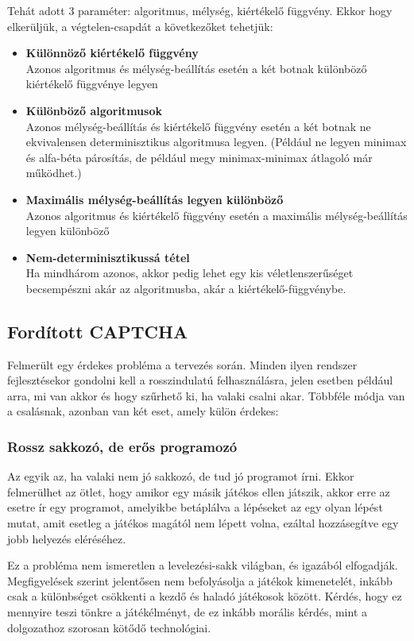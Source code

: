 \documentclass[twoside, a4paper, 12pt]{article}
\begin{document}
Tehát adott 3 paraméter: algoritmus, mélység, kiértékelő függvény. Ekkor hogy elkerüljük, a végtelen-csapdát a következőket tehetjük:
\begin{itemize}
	\item \textbf{Különnöző kiértékelő függvény} \\ 
	Azonos algoritmus és mélység-beállítás esetén a két botnak különböző kiértékelő függvénye legyen
	
	\item \textbf{Különböző algoritmusok} \\
	Azonos mélység-beállítás és kiértékelő függvény esetén a két botnak ne ekvivalensen determinisztikus algoritmusa legyen. (Például ne legyen minimax és alfa-béta párosítás, de például megy minimax-minimax átlagoló már működhet.)
	
	\item \textbf{Maximális mélység-beállítás legyen különböző} \\
	Azonos algoritmus és kiértékelő függvény esetén a maximális mélység-beállítás legyen különböző
	
	\item \textbf{Nem-determinisztikussá tétel} \\
	Ha mindhárom azonos, akkor pedig lehet egy kis véletlenszerűséget becsempészni akár az algoritmusba, akár a kiértékelő-függvénybe.
\end{itemize}

\subsection{Fordított CAPTCHA}
Felmerült egy érdekes probléma a tervezés során. Minden ilyen rendszer fejlesztésekor gondolni kell a rosszindulatú felhasználásra, jelen esetben például arra, mi van akkor és hogy szűrhető ki, ha valaki csalni akar. Többféle módja van a csalásnak, azonban van két eset, amely külön érdekes:
\subsubsection{Rossz sakkozó, de erős programozó}
Az egyik az, ha valaki nem jó sakkozó, de tud jó programot írni. Ekkor felmerülhet az ötlet, hogy amikor egy másik játékos ellen játszik, akkor erre az esetre ír egy programot, amelyikbe betáplálva a lépéseket az egy olyan lépést mutat, amit esetleg a játékos magától nem lépett volna, ezáltal hozzásegítve egy jobb helyezés eléréséhez.

Ez a probléma nem ismeretlen a levelezési-sakk világban, és igazából elfogadják. Megfigyelések szerint jelentősen nem befolyásolja a játékok kimenetelét, inkább csak a különbséget csökkenti a kezdő és haladó játékosok között. \cite{corrChessHelpHu} Kérdés, hogy ez mennyire teszi tönkre a játékélményt, de ez inkább morális kérdés, mint a dolgozathoz szorosan kötődő technológiai.
\end{document}
